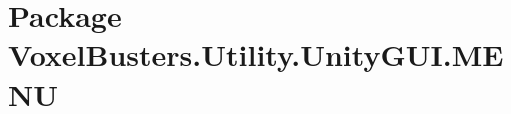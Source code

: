 \hypertarget{namespace_voxel_busters_1_1_utility_1_1_unity_g_u_i_1_1_m_e_n_u}{}\section{Package Voxel\+Busters.\+Utility.\+Unity\+G\+U\+I.\+M\+E\+N\+U}
\label{namespace_voxel_busters_1_1_utility_1_1_unity_g_u_i_1_1_m_e_n_u}
